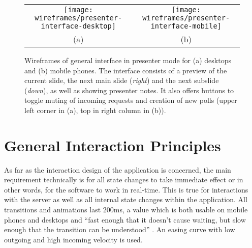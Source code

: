 \begin{figure}
\centering\small
\begin{tabular}{cc}
\texttt{[image: wireframes/presenter-interface-desktop]} &
\texttt{[image: wireframes/presenter-interface-mobile]}\\
(a) & (b)
\end{tabular}
\caption{Wireframes of general interface in presenter mode for (a) desktops and (b) mobile phones. The interface consists of a preview of the current slide, the next main slide (\emph{right}) and the next subslide (\emph{down}), as well as showing presenter notes. It also offers buttons to toggle muting of incoming requests and creation of new polls (upper left corner in (a), top in right column in (b)).}
\label{fig:design-interface-presenter}
\end{figure}

\section{General Interaction Principles}
As far as the interaction design of the application is concerned, the main requirement technically is for all state changes to take immediate effect or in other words, for the software to work in real-time. This is true for interactions with the server as well as all internal state changes within the application. All transitions and animations last $200$ms, a value which is both usable on mobile phones and desktops and ``fast enough that it doesn't cause waiting, but slow enough that the transition can be understood'' \cite{GoogleMaterialDesignGuide}. An easing curve with low outgoing and high incoming velocity is used.









